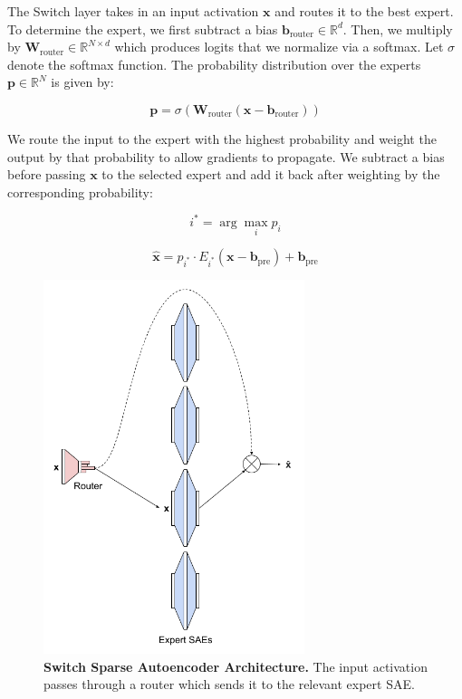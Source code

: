 \documentclass{article} %
\begin{document}
The Switch layer takes in an input activation \( \mathbf{x} \) and routes it to the best expert. To determine the expert, we first subtract a bias \( \mathbf{b}_{\text{router}} \in \mathbb{R}^d \). Then, we multiply by \( \mathbf{W}_{\text{router}} \in \mathbb{R}^{N \times d} \) which produces logits that we normalize via a softmax. Let \( \sigma \) denote the softmax function. The probability distribution over the experts \( \mathbf{p} \in \mathbb{R}^N \) is given by:

\begin{equation}
\mathbf{p} = \sigma (\mathbf{W}_{\text{router}} (\mathbf{x} - \mathbf{b}_{\text{router}}))
\end{equation}

We route the input to the expert with the highest probability and weight the output by that probability to allow gradients to propagate. We subtract a bias before passing \( \mathbf{x} \) to the selected expert and add it back after weighting by the corresponding probability:

\begin{equation}
i^* = \arg \max_i p_i
\end{equation}

\begin{equation}
\hat{\mathbf{x}} = p_{i^*} \cdot E_{i^*} (\mathbf{x} - \mathbf{b}_{\text{pre}}) + \mathbf{b}_{\text{pre}}
\end{equation}


\begin{figure}[h]
\begin{center}
\includegraphics[width=3in]{fig/diagram.png}
\end{center}
\caption{\textbf{Switch Sparse Autoencoder Architecture.} The input activation passes through a router which sends it to the relevant expert SAE.}
\end{figure}
\end{document}
